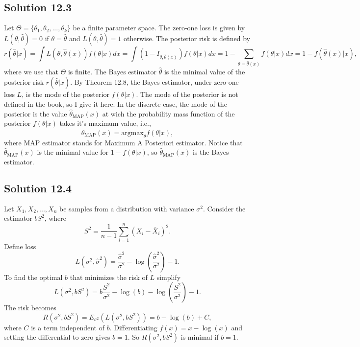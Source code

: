 \subsection*{Solution 12.3}

Let $\Theta = \{\theta_1, \theta_2, ..., \theta_k\}$ be a finite parameter space.
The zero-one loss is given by $L(\theta, \hat{\theta}) = 0$ if $\theta = \hat{\theta}$ and $L(\theta, \hat{\theta}) = 1$ otherwise.
The posterior risk is defined by
\begin{equation*}
    r(\hat{\theta}|x) = \int L(\theta, \hat{\theta}(x)) f(\theta|x) dx
        = \int \left(1 - I_{\theta, \hat{\theta}(x)}\right) f(\theta|x) dx
        = 1 - \sum_{\theta = \hat{\theta}(x)} f(\theta|x) dx
        = 1 - f(\hat{\theta}(x)|x),
\end{equation*}
where we use that $\Theta$ is finite.
The Bayes estimator $\hat{\theta}$ is the minimal value of the posterior risk $r(\hat{\theta}|x)$.
By Theorem 12.8, the Bayes estimator, under zero-one loss $L$, is the mode of the posterior $f(\theta|x)$.
The mode of the posterior is not defined in the book, so I give it here.
In the discrete case, the mode of the posterior is the value $\hat{\theta}_{\mathrm{MAP}}(x)$ at wich the probability mass function of the posterior $f(\theta|x)$ takes it's maximum value, i.e.,
\begin{equation*}
    \hat{\theta}_{\mathrm{MAP}}(x) = \mathrm{argmax}_{\theta} f(\theta|x),
\end{equation*}
where MAP estimator stands for Maximum A Posteriori estimator.
Notice that $\hat{\theta}_{\mathrm{MAP}}(x)$ is the minimal value for $1 - f(\theta|x)$, so $\hat{\theta}_{\mathrm{MAP}}(x)$ is the Bayes estimator.


\subsection*{Solution 12.4}

Let $X_1, X_2, ..., X_n$ be samples from a distribution with variance $\sigma^2$.
Consider the estimator $bS^2$, where
\begin{equation*}
    S^2 = \frac{1}{n - 1} \sum_{i = 1}^n (X_i - \overline{X}_i)^2.
\end{equation*}
Define loss
\begin{equation*}
    L(\sigma^2, \hat{\sigma}^2) = \frac{\hat{\sigma}^2}{\sigma^2} - \log\left(\frac{\hat{\sigma}^2}{\sigma^2}\right) - 1.
\end{equation*}
To find the optimal $b$ that minimizes the risk of $L$ simplify
\begin{equation*}
    L(\sigma^2, bS^2) = b \frac{S^2}{\sigma^2} - \log(b) - \log\left(\frac{S^2}{\sigma^2}\right) - 1.
\end{equation*}
The risk becomes
\begin{equation*}
    R(\sigma^2, bS^2) = E_{\sigma^2}(L(\sigma^2, bS^2))
        = b - \log(b) + C,
\end{equation*}
where $C$ is a term independent of $b$.
Differentiating $f(x) = x - \log(x)$ and setting the differential to zero gives $b = 1$.
So $R(\sigma^2, bS^2)$ is minimal if $b = 1$.
